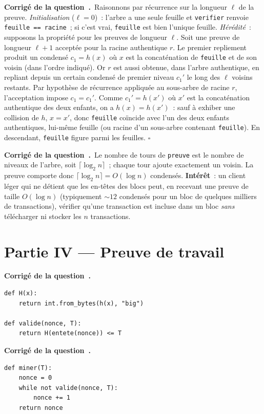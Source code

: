 \documentclass[11pt,a4paper]{article}
\newcounter{qcnt}
\newcommand{\Q}{\medskip\par\stepcounter{qcnt}\noindent\textbf{Corrigé de la question~\theqcnt.}~}
\newcommand{\code}[1]{\lstinline!#1!}
\begin{document}
\Q Raisonnons par récurrence sur la longueur $\ell$ de la preuve.
\emph{Initialisation} ($\ell=0$)~: l'arbre a une seule feuille et \code{verifier} renvoie \code{feuille == racine}~; si c'est vrai, \code{feuille} est bien l'unique feuille.
\emph{Hérédité}~: supposons la propriété pour les preuves de longueur $\ell$. Soit une preuve de longueur $\ell+1$ acceptée pour la racine authentique $r$. Le premier repliement produit un condensé $c_1 = h(x)$ où $x$ est la concaténation de \code{feuille} et de son voisin (dans l'ordre indiqué). Or $r$ est aussi obtenue, dans l'arbre authentique, en repliant depuis un certain condensé de premier niveau $c_1'$ le long des $\ell$ voisins restants. Par hypothèse de récurrence appliquée au sous-arbre de racine $r$, l'acceptation impose $c_1 = c_1'$. Comme $c_1' = h(x')$ où $x'$ est la concaténation authentique des deux enfants, on a $h(x)=h(x')$~: sauf à exhiber une collision de $h$, $x=x'$, donc \code{feuille} coïncide avec l'un des deux enfants authentiques, lui-même feuille (ou racine d'un sous-arbre contenant \code{feuille}). En descendant, \code{feuille} figure parmi les feuilles. \hfill$\square$

\Q Le nombre de tours de \code{preuve} est le nombre de niveaux de l'arbre, soit $\lceil \log_2 n\rceil$~; chaque tour ajoute exactement un voisin. La preuve comporte donc $\lceil\log_2 n\rceil = O(\log n)$ condensés. \textbf{Intérêt}~: un client léger qui ne détient que les en-têtes des blocs peut, en recevant une preuve de taille $O(\log n)$ (typiquement $\sim 12$ condensés pour un bloc de quelques milliers de transactions), vérifier qu'une transaction est incluse dans un bloc \emph{sans} télécharger ni stocker les $n$ transactions.

\section*{Partie IV --- Preuve de travail}

\Q
\begin{lstlisting}
def H(x):
    return int.from_bytes(h(x), "big")

def valide(nonce, T):
    return H(entete(nonce)) <= T
\end{lstlisting}

\Q
\begin{lstlisting}
def miner(T):
    nonce = 0
    while not valide(nonce, T):
        nonce += 1
    return nonce
\end{lstlisting}
\end{document}
